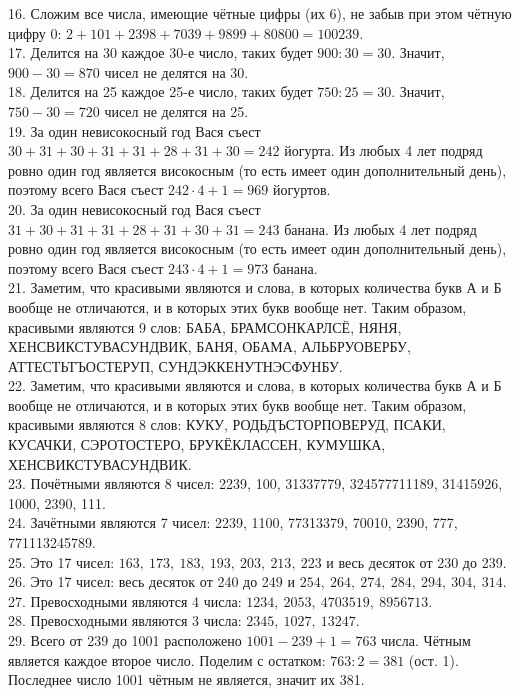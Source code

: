\documentclass[12pt]{article}
\begin{document}
16. Сложим все числа, имеющие чётные цифры (их 6), не забыв при этом чётную цифру 0: $2+101+2398+7039+9899+80800=100239.$\\
17. Делится на 30 каждое 30-е число, таких будет $900:30=30.$ Значит, $900-30=870$ чисел не делятся на 30.\\
18. Делится на 25 каждое 25-е число, таких будет $750:25=30.$ Значит, $750-30=720$ чисел не делятся на 25.\\
19. За один невисокосный год Вася съест $30+31+30+31+31+28+31+30=242$ йогурта. Из любых 4 лет подряд ровно один год является високосным (то есть имеет один дополнительный день), поэтому всего Вася съест $242\cdot4+1=969$ йогуртов.\\
20. За один невисокосный год Вася съест $31+30+31+31+28+31+30+31=243$ банана. Из любых 4 лет подряд ровно один год является високосным (то есть имеет один дополнительный день), поэтому всего Вася съест $243\cdot4+1=973$ банана.\\
21. Заметим, что красивыми являются и слова, в которых количества букв А и Б вообще не отличаются, и в которых этих букв вообще нет. Таким образом, красивыми являются 9 слов: БАБА, БРАМСОНКАРЛСЁ, НЯНЯ, ХЕНСВИКСТУВАСУНДВИК, БАНЯ, ОБАМА, АЛЬБРУОВЕРБУ, АТТЕСТЬТЪОСТЕРУП, СУНДЭККЕНУТНЭСФУНБУ.\\
22. Заметим, что красивыми являются и слова, в которых количества букв А и Б вообще не отличаются, и в которых этих букв вообще нет. Таким образом, красивыми являются 8 слов: КУКУ, РОДЬДЪСТОРПОВЕРУД, ПСАКИ, КУСАЧКИ, СЭРОТОСТЕРО, БРУКЁКЛАССЕН, КУМУШКА, ХЕНСВИКСТУВАСУНДВИК.\\
23. Почётными являются 8 чисел: 2239, 100, 31337779, 324577711189, 31415926, 1000, 2390, 111.\\
24. Зачётными являются 7 чисел: 2239, 1100, 77313379, 70010, 2390, 777, 771113245789.\\
25. Это 17 чисел: $163,\ 173,\ 183,\ 193,\ 203,\ 213,\ 223$ и весь десяток от 230 до 239.\\
26. Это 17 чисел: весь десяток от 240 до 249 и $254,\ 264,\ 274,\ 284,\ 294,\ 304,\ 314.$\\
27. Превосходными являются 4 числа: $1234,\ 2053,\ 4703519,\ 8956713.$\\
28. Превосходными являются 3 числа: $2345,\ 1027,\ 13247.$\\
29. Всего от 239 до 1001 расположено $1001-239+1=763$ числа. Чётным является каждое второе число. Поделим с остатком: $763:2=381$ (ост. 1). Последнее число 1001 чётным не является, значит их 381.\\
\end{document}
